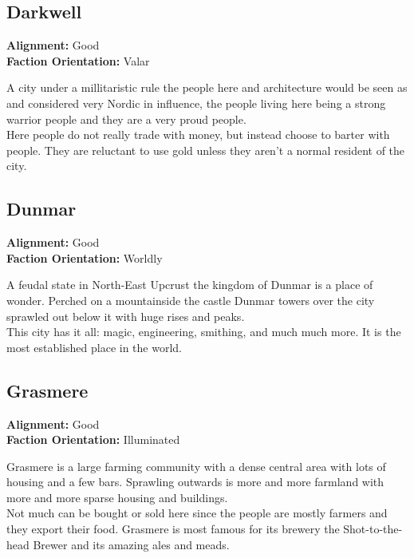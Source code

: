 \documentclass[10pt,twoside,twocolumn]{article}
\begin{document}
\subsection{Darkwell}
\textbf{Alignment:} Good \\
\textbf{Faction Orientation:} Valar \\
\begin{quotebox}
	A city under a millitaristic rule the people here and architecture would be seen as and considered very Nordic in influence, the people living here being a strong warrior people and they are a very proud people. \\

	Here people do not really trade with money, but instead choose to barter with people. They are reluctant to use gold unless they aren't a normal resident of the city. \\
\end{quotebox}

\subsection{Dunmar}
\textbf{Alignment:} Good \\
\textbf{Faction Orientation:} Worldly \\
\begin{quotebox}
	A feudal state in North-East Upcrust the kingdom of Dunmar is a place of wonder. Perched on a mountainside the castle Dunmar towers over the city sprawled out below it with huge rises and peaks. \\

	This city has it all: magic, engineering, smithing, and much much more. It is the most established place in the world. \\
\end{quotebox}

\subsection{Grasmere}
\textbf{Alignment:} Good \\
\textbf{Faction Orientation:} Illuminated \\
\begin{quotebox}
	Grasmere is a large farming community with a dense central area with lots of housing and a few bars. Sprawling outwards is more and more farmland with more and more sparse housing and buildings. \\

	Not much can be bought or sold here since the people are mostly farmers and they export their food. Grasmere is most famous for its brewery the Shot-to-the-head Brewer and its amazing ales and meads. \\
\end{quotebox}
\end{document}
